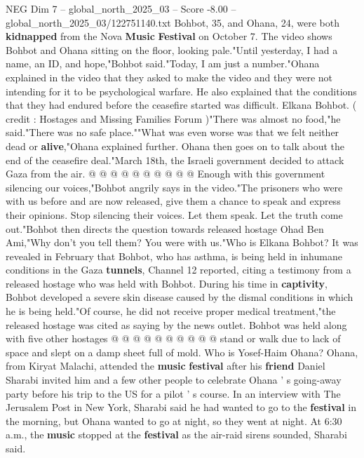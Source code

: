 \begin{textsample}{NEG Dim 7 – global\_north\_2025\_03 – Score -8.00 – global\_north\_2025\_03/122751140.txt}  \label{ex:f7_neg_127}
Bohbot, 35, and Ohana, 24, were both \textbf{kidnapped} from the Nova \textbf{Music} \textbf{Festival} on October 7.
The video shows Bohbot and Ohana sitting on the floor, looking pale."Until yesterday, I had a name, an ID, and hope,"Bohbot said."Today, I am just a number."Ohana explained in the video that they asked to make the video and they were not intending for it to be psychological warfare.
He also explained that the conditions that they had endured before the ceasefire started was difficult.
Elkana Bohbot. ( credit : Hostages and Missing Families Forum )"There was almost no food,"he said."There was no safe place.""What was even worse was that we felt neither dead or \textbf{alive},"Ohana explained further.
Ohana then goes on to talk about the end of the ceasefire deal."March 18th, the Israeli government decided to attack Gaza from the air. @ @ @ @ @ @ @ @ @ @ Enough with this government silencing our voices,"Bohbot angrily says in the video."The prisoners who were with us before and are now released, give them a chance to speak and express their opinions.
Stop silencing their voices.
Let them speak.
Let the truth come out."Bohbot then directs the question towards released hostage Ohad Ben Ami,"Why don't you tell them?
You were with us."Who is Elkana Bohbot?
It was revealed in February that Bohbot, who has asthma, is being held in inhumane conditions in the Gaza \textbf{tunnels}, Channel 12 reported, citing a testimony from a released hostage who was held with Bohbot.
During his time in \textbf{captivity}, Bohbot developed a severe skin disease caused by the dismal conditions in which he is being held."Of course, he did not receive proper medical treatment,"the released hostage was cited as saying by the news outlet.
Bohbot was held along with five other hostages @ @ @ @ @ @ @ @ @ @ stand or walk due to lack of space and slept on a damp sheet full of mold.
Who is Yosef-Haim Ohana?
Ohana, from Kiryat Malachi, attended the \textbf{music} \textbf{festival} after his \textbf{friend} Daniel Sharabi invited him and a few other people to celebrate Ohana ' s going-away party before his trip to the US for a pilot ' s course.
In an interview with The Jerusalem Post in New York, Sharabi said he had wanted to go to the \textbf{festival} in the morning, but Ohana wanted to go at night, so they went at night.
At 6:30 a.m., the \textbf{music} stopped at the \textbf{festival} as the air-raid sirens sounded, Sharabi said.

\end{textsample}
